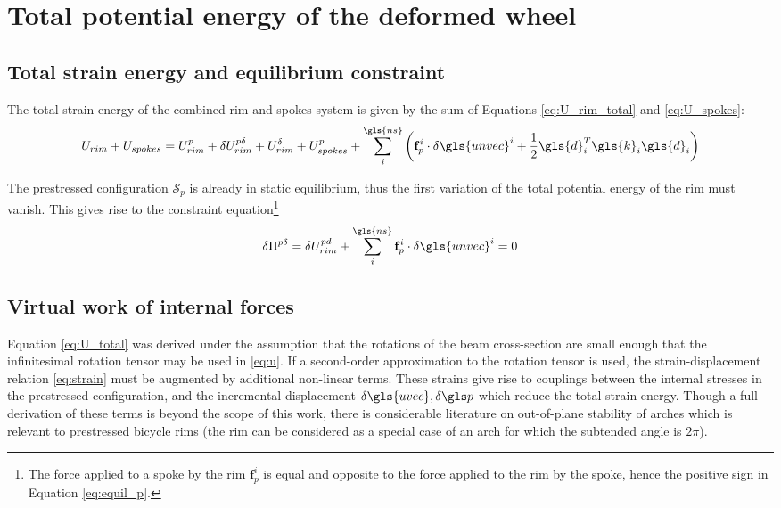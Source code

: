 \documentclass[\rootdir/thesis.tex]{subfiles}
\begin{document}
\section{Total potential energy of the deformed wheel}

\subsection{Total strain energy and equilibrium constraint}

The total strain energy of the combined rim and spokes system is given by the sum of Equations \eqref{eq:U_rim_total} and \eqref{eq:U_spokes}:
\begin{equation}
\label{eq:U_total}
U_{rim} + U_{spokes} = U_{rim}^p + \delta U_{rim}^{p\delta} + U_{rim}^{\delta} + 
	U_{spokes}^p + \sum_i^{\gls{ns}} \left(\mathbf{f}_p^i \cdot \delta\gls{unvec}^i +
    \frac{1}{2}\gls{d}_i^T \gls{k}_i \gls{d}_i\right)
\end{equation}

The prestressed configuration $\mathcal{S}_p$ is already in static equilibrium, thus the first variation of the total potential energy of the rim must vanish. This gives rise to the constraint equation\footnote{The force applied to a spoke by the rim $\mathbf{f}_p^i$ is equal and opposite to the force applied to the rim by the spoke, hence the positive sign in Equation \eqref{eq:equil_p}.}
\begin{equation}
\label{eq:equil_p}
\delta\Pi^{p\delta} = \delta U_{rim}^{pd} + \sum_i^{\gls{ns}} \mathbf{f}_p^i \cdot \delta\gls{unvec}^i = 0
\end{equation}


\subsection{Virtual work of internal forces}

Equation \eqref{eq:U_total} was derived under the assumption that the rotations of the beam cross-section are small enough that the infinitesimal rotation tensor may be used in \eqref{eq:u}. If a second-order approximation to the rotation tensor is used, the strain-displacement relation \eqref{eq:strain} must be augmented by additional non-linear terms. These strains give rise to couplings between the internal stresses in the prestressed configuration, and the incremental displacement $\delta\gls{uvec}, \delta\p$ which reduce the total strain energy. Though a full derivation of these terms is beyond the scope of this work, there is considerable literature on out-of-plane stability of arches which is relevant to prestressed bicycle rims (the rim can be considered as a special case of an arch for which the subtended angle is $2\pi$).
\end{document}
